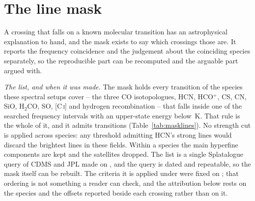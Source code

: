 \section{The line mask}
\label{app:linemask}

A crossing that falls on a known molecular transition has an astrophysical
explanation to hand, and the mask exists to say which crossings those are. It
reports the frequency coincidence and the judgement about the coinciding
species separately, so the reproducible part can be recomputed and the
arguable part argued with.

\emph{The list, and when it was made.} The mask holds every transition of the
\FrNSpec{} species these spectral setups cover -- the three CO isotopologues,
HCN, HCO$^{+}$, CS, CN, SiO, H$_2$CO, SO, [C\,\textsc{i}] and hydrogen
recombination -- that falls inside one of the \McNIsland{} searched frequency
intervals with an upper-state energy below \McEuMax\,K. That rule is the whole
of it, and it admits \FrNTrans{} transitions (Table~\ref{tab:masklines}).
No strength cut is applied across species: any threshold admitting HCN's
strong lines would discard the brightest lines in these fields. Within a
species the main hyperfine components are kept and the satellites
dropped. The list is a single Splatalogue query
\citep{Splatalogue2007} of CDMS and JPL \citep{Pickett1998,CDMS2005} made on
\MkListDate{}, and the query is dated and repeatable, so the mask itself can
be rebuilt. The criteria it is applied under were fixed on \MkCritDate{};
that ordering is not something a reader can check, and the attribution below
rests on the species and the offsets reported beside each crossing rather
than on it.

